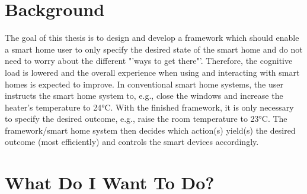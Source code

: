 \documentclass[a4paper,11pt]{article}
\begin{document}
\section{Background}
The goal of this thesis is to design and develop a framework which should enable a smart home user to only specify the desired state of the smart home and do not need to worry about the different "'ways to get there"'.
Therefore, the cognitive load is lowered and the overall experience when using and interacting with smart homes is expected to improve.
In conventional smart home systems, the user instructs the smart home system to, e.g., close the windows and increase the heater's temperature to 24°C.
With the finished framework, it is only necessary to specify the desired outcome, e.g., raise the room temperature to 23°C.
The framework/smart home system then decides which action(s) yield(s) the desired outcome (most efficiently) and controls the smart devices accordingly.


\section{What Do I Want To Do?}
\end{document}

